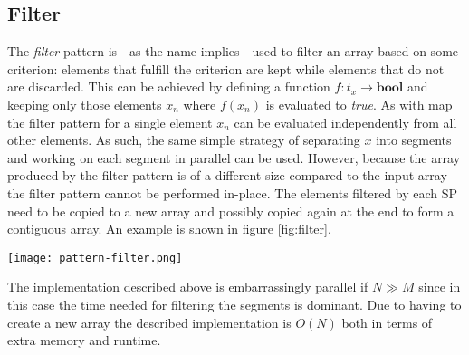 \subsection{Filter}
The \textit{filter} pattern is - as the name implies - used to filter an array based on some criterion:
elements that fulfill the criterion are kept while elements that do not are discarded.
This can be achieved by defining a function $f: t_x \rightarrow \textbf{bool}$ and keeping only those elements $x_n$
where $f(x_n)$ is evaluated to \textit{true}.
As with map the filter pattern for a single element $x_n$ can be evaluated independently from all other elements.
As such, the same simple strategy of separating $x$ into segments and working on each segment in parallel can be used.
However, because the array produced by the filter pattern is of a different size
compared to the input array the filter pattern cannot be performed in-place.
The elements filtered by each SP need to be copied to a new array and possibly copied again at the end to form a contiguous array.
An example is shown in figure \ref{fig:filter}.
\begin{figure*}
	\centering
	\texttt{[image: pattern-filter.png]}
	\caption{
		Visualization of the filter pattern.
		Only integers smaller than 4 are accepted.
		The operation is not in-place.
	}
	\label{fig:filter}
\end{figure*}

The implementation described above is embarrassingly parallel if $N \gg M$
since in this case the time needed for filtering the segments is dominant.
Due to having to create a new array the described implementation is $O(N)$ both in terms of extra memory and runtime.
